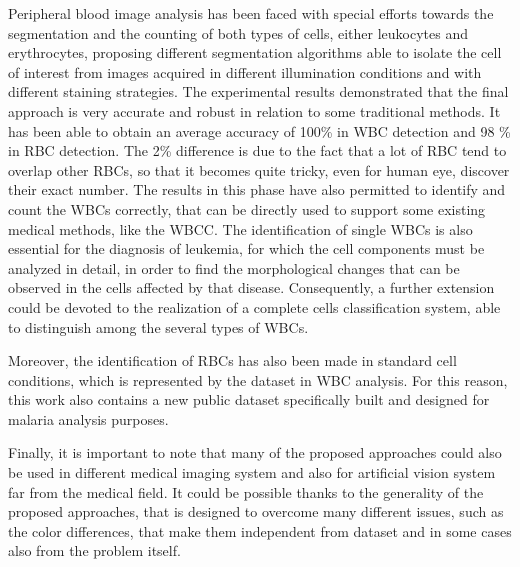 \documentclass[final,a4paper,12pt,english]{UnicaPhdThesis3}
\begin{document}
{Peripheral blood image analysis has been faced with special efforts towards the segmentation and the counting of both types of cells, either leukocytes and erythrocytes, proposing different segmentation algorithms able to isolate the cell of interest from images acquired in different illumination conditions and with different staining strategies.
The experimental results demonstrated that the final approach is very accurate and robust in relation to some traditional methods. It has been able to obtain an average accuracy of 100\% in WBC detection and 98 \%  in RBC detection. The 2\% difference is due to the fact that a lot of RBC tend to overlap other RBCs, so that it becomes quite tricky, even for human eye, discover their exact number. The results in this phase have also permitted to identify and count the WBCs correctly, that can be directly used to support some existing medical methods, like the WBCC. 
The identification of single WBCs is also essential for the diagnosis of leukemia, for which the cell components must be analyzed in detail, in order to find the morphological changes that can be observed in the cells affected by that disease.  Consequently, a further extension could be devoted to the realization of a complete cells classification system, able to distinguish among the several types of WBCs.

Moreover, the identification of RBCs has also been made in standard cell conditions, which is represented by the dataset in WBC analysis. For this reason, this work also contains a new public dataset specifically built and designed for malaria analysis purposes.

Finally, it is important to note that many of the proposed approaches could also be used in different medical imaging system and also for artificial vision system far from the medical field. It could be possible thanks to the generality of the proposed approaches, that is designed to overcome many different issues, such as the color differences, that make them independent from dataset and in some cases also from the problem itself.

}
\end{document}
